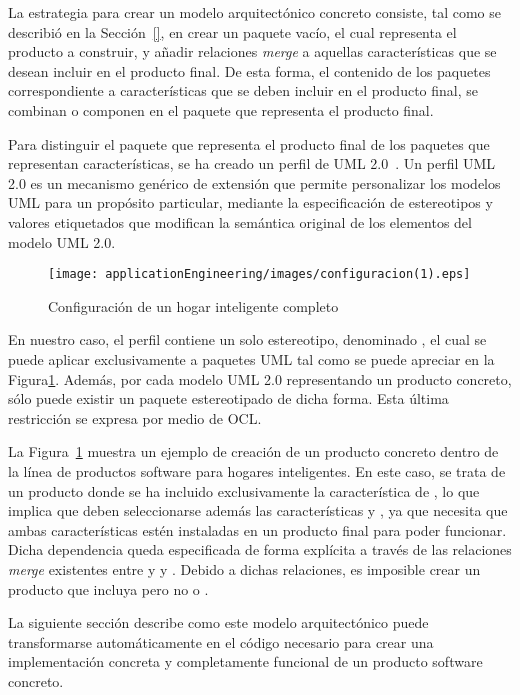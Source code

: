 
La estrategia para crear un modelo arquitectónico concreto consiste, tal como se describió en la Sección~\ref{}, en crear un paquete vacío, el cual representa el producto a construir, y añadir relaciones \emph{merge} a aquellas características que se desean incluir en el producto final. De esta forma, el contenido de los paquetes correspondiente a características que se deben incluir en el producto final, se combinan o componen en el paquete que representa el producto final.

Para distinguir el paquete que representa el producto final de los paquetes que representan características, se ha creado un perfil de UML 2.0~\citep{omg:uml:2005}. Un perfil UML 2.0 es un mecanismo genérico de extensión que permite personalizar los modelos UML para un propósito particular, mediante la especificación de estereotipos y valores etiquetados que modifican la semántica original de los elementos del modelo UML 2.0.

\begin{figure}[!tb]
  \center
  \texttt{[image: applicationEngineering/images/configuracion(1).eps]} \\
  \caption{Configuración de un hogar inteligente completo}
  \label{app:fig:conf1}
\end{figure}

En nuestro caso, el perfil contiene un solo estereotipo, denominado , el cual se puede aplicar exclusivamente a paquetes UML tal como se puede apreciar en la Figura\ref{app:fig:conf1}. Además, por cada modelo UML 2.0 representando un producto concreto, sólo puede existir un paquete estereotipado de dicha forma. Esta última restricción se expresa por medio de OCL.

La Figura~\ref{app:fig:conf1} muestra un ejemplo de creación de un producto concreto dentro de la línea de productos software para hogares inteligentes. En este caso, se trata de un producto donde se ha incluido exclusivamente la característica de , lo que implica que deben seleccionarse además las características  y , ya que  necesita que ambas características estén instaladas en un producto final para poder funcionar. Dicha dependencia queda especificada de forma explícita a través de las relaciones \emph{merge} existentes entre  y  y . Debido a dichas relaciones, es imposible crear un producto que incluya  pero no  o .

La siguiente sección describe como este modelo arquitectónico puede transformarse automáticamente en el código necesario para crear una implementación concreta y completamente funcional de un producto software concreto.


